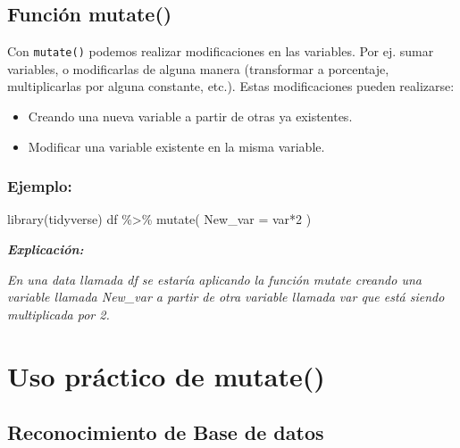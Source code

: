 \documentclass[
]{book}
\newenvironment{Shaded}{\begin{snugshade}}{\end{snugshade}}
\newcommand{\AttributeTok}[1]{\textcolor[rgb]{0.77,0.63,0.00}{#1}}
\newcommand{\DecValTok}[1]{\textcolor[rgb]{0.00,0.00,0.81}{#1}}
\newcommand{\FunctionTok}[1]{\textcolor[rgb]{0.00,0.00,0.00}{#1}}
\newcommand{\NormalTok}[1]{#1}
\newcommand{\SpecialCharTok}[1]{\textcolor[rgb]{0.00,0.00,0.00}{#1}}
\begin{document}
\hypertarget{funciuxf3n-mutate}{%
\subsection{Función mutate()}\label{funciuxf3n-mutate}}

Con \texttt{mutate()} podemos realizar modificaciones en las variables. Por ej. sumar variables, o modificarlas de alguna manera (transformar a porcentaje, multiplicarlas por alguna constante, etc.). Estas modificaciones pueden realizarse:

\begin{itemize}
\item
  Creando una nueva variable a partir de otras ya existentes.
\item
  Modificar una variable existente en la misma variable.
\end{itemize}

\hypertarget{ejemplo-1}{%
\subsubsection{Ejemplo:}\label{ejemplo-1}}

\begin{Shaded}
\begin{Highlighting}[]
\FunctionTok{library}\NormalTok{(tidyverse)}
\NormalTok{df }\SpecialCharTok{\%\textgreater{}\%} 
  \FunctionTok{mutate}\NormalTok{(}
    \AttributeTok{New\_var =}\NormalTok{ var}\SpecialCharTok{*}\DecValTok{2}
\NormalTok{  )}
\end{Highlighting}
\end{Shaded}

\emph{\textbf{Explicación:}}

\emph{En una data llamada df se estaría aplicando la función mutate creando una variable llamada New\_var a partir de otra variable llamada var que está siendo multiplicada por 2.}

\hypertarget{uso-pruxe1ctico-de-mutate}{%
\section{Uso práctico de mutate()}\label{uso-pruxe1ctico-de-mutate}}

\hypertarget{reconocimiento-de-base-de-datos}{%
\subsection{Reconocimiento de Base de datos}\label{reconocimiento-de-base-de-datos}}
\end{document}
